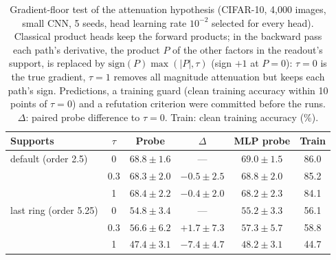 \begin{table}[h]
\centering
\caption{Gradient-floor test of the attenuation hypothesis (CIFAR-10, 4,000 images, small CNN,
5 seeds, head learning rate $10^{-2}$ selected for every head). Classical product heads keep the
forward products; in the backward pass each path's derivative, the product $P$ of the other
factors in the readout's support, is replaced by $\mathrm{sign}(P)\max(|P|,\tau)$ (sign $+1$ at $P=0$): $\tau=0$ is the
true gradient, $\tau=1$ removes all magnitude attenuation but keeps each path's sign. Predictions,
a training guard (clean training accuracy within 10 points of $\tau=0$) and a refutation criterion
were committed before the runs. $\Delta$: paired probe difference to $\tau=0$. Train: clean
training accuracy (\%).}
\label{tab:floor}
\small
\begin{tabular}{lccccc}
\toprule
Supports & $\tau$ & Probe & $\Delta$ & MLP probe & Train \\
\midrule
default (order 2.5) & 0 & $68.8 \pm 1.6$ & --- & $69.0 \pm 1.5$ & 86.0 \\
 & 0.3 & $68.3 \pm 2.0$ & $-0.5 \pm 2.5$ & $68.8 \pm 2.0$ & 85.2 \\
 & 1 & $68.4 \pm 2.2$ & $-0.4 \pm 2.0$ & $68.2 \pm 2.3$ & 84.1 \\
\addlinespace
last ring (order 5.25) & 0 & $54.8 \pm 3.4$ & --- & $55.2 \pm 3.3$ & 56.1 \\
 & 0.3 & $56.6 \pm 6.2$ & $+1.7 \pm 7.3$ & $57.3 \pm 5.7$ & 58.8 \\
 & 1 & $47.4 \pm 3.1$ & $-7.4 \pm 4.7$ & $48.2 \pm 3.1$ & 44.7 \\
\bottomrule
\end{tabular}
\end{table}
